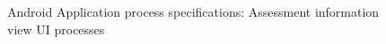 \begin{figure}[H]
\centering	
{}
\caption{Android Application process specifications: Assessment information view UI processes}
\end{figure}


\newpage
